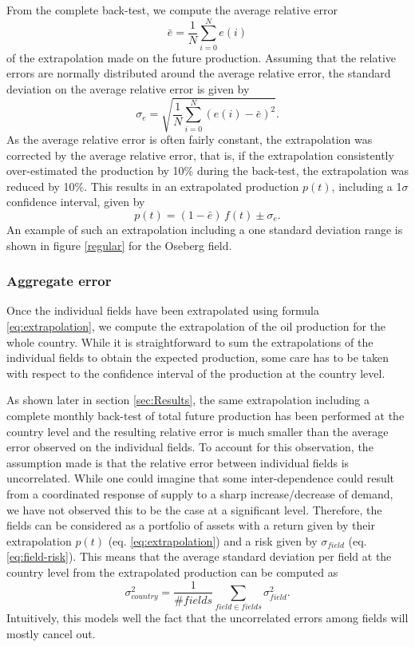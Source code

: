\documentclass[review]{elsarticle}
\begin{document}
From the complete back-test, we compute the average relative error
\begin{equation}
\bar{e}=\frac{1}{N}\sum_{i=0}^{N}e(i)
\end{equation}
of the extrapolation made on the future production. Assuming that the
relative errors are normally distributed around the average relative
error, the standard deviation on the average relative error is given
by 
\begin{equation}
\sigma_{e}=\sqrt{\frac{1}{N}\sum_{i=0}^{N}\left(e(i)-\bar{e}\right)^{2}}.\label{eq:field-risk}
\end{equation}
As the average relative error is often fairly constant, the extrapolation
was corrected by the average relative error, that is, if the extrapolation
consistently over-estimated the production by 10\% during the back-test,
the extrapolation was reduced by 10\%. This results in an extrapolated
production $p(t)$, including a 1$\sigma$ confidence interval, given by
\begin{equation}
p(t)=(1-\bar{e})\, f(t)\pm\sigma_{e}.
\label{eq:extrapolation}
\end{equation}
An example of such an extrapolation including a one standard deviation
range is shown in figure \ref{regular} for the Oseberg field.


\subsubsection{Aggregate error}

Once the individual fields have been extrapolated using
formula \ref{eq:extrapolation}, we compute the extrapolation of the oil production
for the whole country. While it is straightforward to sum the extrapolations
of the individual fields to obtain the expected production, some care
has to be taken with respect to the confidence interval of the production
at the country level.

As shown later in section \ref{sec:Results}, the same extrapolation
including a complete monthly back-test of total future production
has been performed at the country level and the resulting relative
error is much smaller than the average error observed on the individual
fields. To account for this observation, the assumption made is that
the relative error between individual fields is uncorrelated. 
While one could imagine that some inter-dependence could result from
a coordinated response of supply to a sharp increase/decrease of demand,  we have not 
observed this to be the case at a significant level. Therefore,
the fields can be considered as a portfolio of assets with a return
given by their extrapolation $p(t)$ (eq. \ref{eq:extrapolation})
and a risk given by $\sigma_{field}$ (eq. \ref{eq:field-risk}).
This means that the average standard deviation per field
at the country level from the extrapolated production can be computed as 
\begin{equation}
\sigma_{country}^{2}=\frac{1}{\#fields}\sum_{field\in fields}\sigma_{field}^{2}.
\end{equation}
Intuitively, this models well the fact that the uncorrelated errors
among fields will mostly cancel out. 
\end{document}
